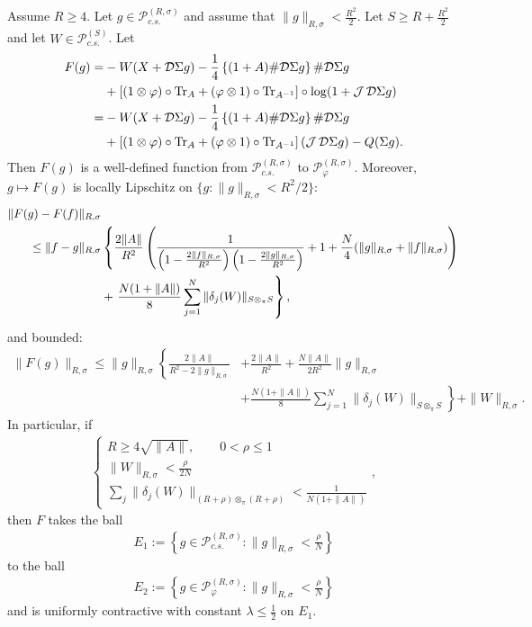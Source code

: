 \begin{cor}\label{F}
Assume $R\geq4$. Let $g\in \mathscr{P}^{(R,\sigma)}_{c.s.}$ and assume that $\|g\|_{R,\sigma}< \frac{R^2}{2}$. Let $S\geq R+\frac{R^2}{2}$ and let $W\in \mathscr{P}^{(S)}_{c.s.}$. Let
	\begin{align*}
		F(g) =& - W(X+\mathcal D\Sigma g) -   \frac{1}{4}\left\{(1+A)\#\mathcal D\Sigma g\right\} \#\mathcal D\Sigma g\\
			& + \left[(1\otimes\varphi)\circ\text{Tr}_{A}+(\varphi\otimes 1)\circ\text{Tr}_{A^{-1}}\right]\circ\log(1+\operatorname{\mathcal J}\mathcal D\Sigma g)\\
			=& - W(X+\mathcal D\Sigma g) -   \frac{1}{4}\left\{(1+A)\#\mathcal D\Sigma g\right\} \#\mathcal D\Sigma g \\
			 &+  \left[(1\otimes\varphi)\circ\text{Tr}_{A}+(\varphi\otimes 1)\circ\text{Tr}_{A^{-1}}\right](\operatorname{\mathcal J}\mathcal D\Sigma g)-Q(\Sigma g).
	\end{align*}
Then $F(g)$ is a well-defined function from $\mathscr{P}^{(R,\sigma)}_{c.s.}$ to $\mathscr{P}^{(R,\sigma)}_{\varphi}$. Moreover, $g\mapsto F(g)$ is locally Lipschitz on $\{g\colon \|g\|_{R,\sigma}< R^2/2\}$:
	\begin{align*}
		\| F(g)-F(f)\|_{R,\sigma}&\\
			\leq\| f - g\|_{R,\sigma}  &\left\{ \frac{2\|A\|}{R^2} \left( \frac{1}{\left(1-\frac{2\|f\|_{R,\sigma}}{R^2}\right)\left(1-\frac{2\|g\|_{R,\sigma}}{R^2}\right)} + 1+ \frac{N}{4}(\|g\|_{R,\sigma}+\|f\|_{R,\sigma}) \right)\right.\\
			 &+ \left. \vphantom{\frac{1}{\left(1-\frac{2\|f\|_{R,\sigma}}{R^2}\right)\left(1-\frac{2\|g\|_{R,\sigma}}{R^2}\right)}}         \frac{N(1+\|A\|)}{8}\sum_{j=1}^N\| \delta_j(W)\|_{S\otimes_\pi S}\right\},
	\end{align*}
and bounded:
	\begin{align*}
		\| F(g)\|_{R,\sigma} \leq \| g\|_{R,\sigma} \left\{ \frac{2\|A\|}{R^2-2\|g\|_{R,\sigma}}\right.& + \frac{2\|A\|}{R^2}+ \frac{N\|A\|}{2R^2}\|g\|_{R,\sigma}\\
			&\left. + \frac{N(1+\|A\|)}{8}\sum_{j=1}^N\| \delta_j(W)\|_{S\otimes_\pi S}\right\}+\|W\|_{R,\sigma}.
	\end{align*}
In particular, if
	\begin{align}\label{contractive_data}
		\left\{\begin{array}{l} R\geq4\sqrt{\|A\|},\qquad 0<\rho\leq 1\\
					    \|W\|_{R,\sigma}<\frac{\rho}{2N}\\
					    \sum_j\|\delta_j(W)\|_{(R+\rho)\otimes_{\pi}(R+\rho)}<\frac{1}{N(1+\|A\|)}\end{array}\right.,
	\end{align}
then $F$ takes the ball
	\begin{align*}
		E_1:=\left\{g\in\mathscr{P}^{(R,\sigma)}_{c.s.}\colon \|g\|_{R,\sigma}<\frac{\rho}{N}\right\}
	\end{align*}
to the ball
	\begin{align*}
		E_2:=\left\{ g\in\mathscr{P}^{(R,\sigma)}_\varphi\colon \|g\|_{R,\sigma}<\frac{\rho}{N}\right\}
	\end{align*} 
and is uniformly contractive with constant $\lambda\leq \frac{1}{2}$ on $E_1$.
\end{cor}


